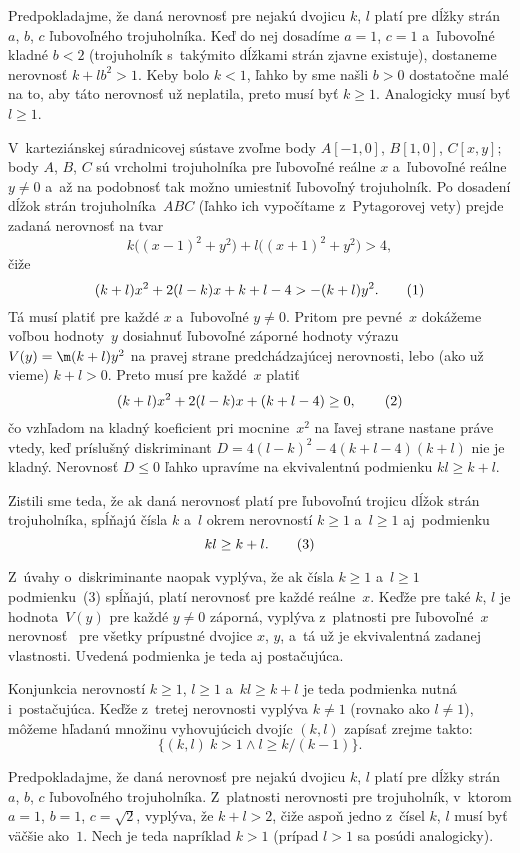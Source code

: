 {%
Predpokladajme, že daná nerovnosť pre nejakú dvojicu $k$, $l$ platí
pre dĺžky strán $a$, $b$, $c$ ľubovoľného trojuholníka.
Keď do nej dosadíme $a= 1$, $c = 1$ a~ľubovoľné kladné $b<2$ (trojuholník
s~takýmito dĺžkami strán zjavne existuje), dostaneme nerovnosť $k+lb^2>1$.
Keby bolo $k<1$, ľahko by sme našli $b>0$ dostatočne malé na to, aby táto
nerovnosť už neplatila, preto musí byť $k\ge 1$.
Analogicky musí byť $l \ge 1$.

V~karteziánskej súradnicovej sústave zvoľme body $A[-1,0]$,
$B[1,0]$, $C[x, y]$; body $A$, $B$, $C$ sú vrcholmi trojuholníka pre
ľubovoľné reálne $x$ a~ľubovoľné reálne $y \ne 0$ a~až na podobnosť tak možno
umiestniť ľubovoľný trojuholník. Po dosadení dĺžok strán
trojuholníka~$ABC$ (ľahko ich vypočítame z~Pytagorovej vety) prejde
zadaná nerovnosť na tvar
$$
k\big((x-1)^2+y^2\big)+l\big((x+1)^2+y^2\big)> 4,
$$
čiže
$$
(k+l) x^2+2 (l-k) x+k+l-4>-(k+l)y^2. \tag1
$$
Tá musí platiť pre každé $x$ a~ľubovoľné $y \ne 0$.
Pritom pre pevné~$x$ dokážeme voľbou hodnoty~$y$ dosiahnuť ľubovoľné záporné
hodnoty výrazu $V(y) =\m(k+l) y^2$ na pravej strane predchádzajúcej nerovnosti, lebo
(ako už vieme) $k+l>0$. Preto musí pre každé~$x$ platiť
$$
(k+l)x^2+2 (l-k) x+(k+l-4) \ge 0, \tag2
$$
čo vzhľadom na kladný koeficient pri mocnine~$x^2$ na ľavej strane
nastane práve vtedy, keď príslušný diskriminant $D =4(l-k)^2-4(k+l-4)(k+l)$
nie je kladný. Nerovnosť $D\le0$ ľahko upravíme na ekvivalentnú podmienku
$kl\ge k+l$.

Zistili sme teda, že ak daná nerovnosť platí pre ľubovoľnú trojicu
dĺžok strán trojuholníka, spĺňajú čísla $k$ a~$l$ okrem nerovností
$k\ge 1$ a~$l \ge 1$ aj~podmienku
$$
kl \ge k+l . \tag3
$$

Z~úvahy o~diskriminante naopak vyplýva, že ak čísla $k\ge1$ a~$l\ge1$
podmienku~(3) spĺňajú, platí nerovnosť  pre každé reálne~$x$.
Keďže pre také $k$, $l$ je hodnota~$V(y)$ pre každé $y \ne 0$
záporná, vyplýva z~platnosti  pre ľubovoľné~$x$ nerovnosť~
pre všetky prípustné dvojice $x$, $y$, a~tá už je
ekvivalentná zadanej vlastnosti. Uvedená podmienka je teda
aj postačujúca.

Konjunkcia nerovností $k\ge1$, $l\ge1$ a~$kl\ge k+l$ je teda podmienka nutná
i~postačujúca. Keďže z~tretej nerovnosti vyplýva $k\ne1$ (rovnako ako $l\ne1$),
môžeme hľadanú množinu vyhovujúcich dvojíc $(k,l)$ zapísať zrejme takto:
$$
\{(k,l)\: k>1\land l\ge k/(k-1)\}.
$$


\ineriesenie
Predpokladajme, že daná nerovnosť pre nejakú dvojicu $k$, $l$ platí
pre dĺžky strán $a$, $b$, $c$ ľubovoľného trojuholníka.
Z~platnosti nerovnosti pre trojuholník, v~ktorom $a=1$, $b = 1$,
$c = \sqrt2$, vyplýva, že $k+l> 2$, čiže aspoň jedno z~čísel $k$, $l$
musí byť väčšie ako~$1$. Nech je teda napríklad $k>1$
(prípad $l>1$ sa posúdi analogicky).

}
